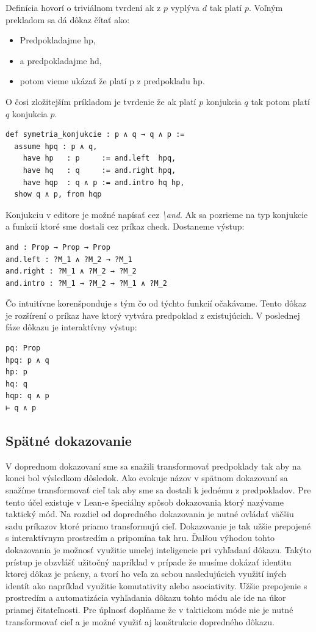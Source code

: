 \documentclass[a4paper,10pt,oneside]{report}%
\begin{document}
    Definícia hovorí o triviálnom tvrdení ak z $p$ vyplýva $d$ tak platí $p$. Voľným
prekladom sa dá dôkaz čítať ako:

\begin{itemize}
    \item Predpokladajme hp,
    \item a predpokladajme hd,
    \item potom vieme ukázať že platí p z predpokladu hp.
\end{itemize}

    O čosi zložitejším príkladom je tvrdenie že ak platí $p$ konjukcia $q$ tak potom
platí $q$ konjukcia $p$.

\begin{lstlisting}
def symetria_konjukcie : p ∧ q → q ∧ p :=
  assume hpq : p ∧ q,
    have hp   : p     := and.left  hpq,
    have hq   : q     := and.right hpq,
    have hqp  : q ∧ p := and.intro hq hp,
  show q ∧ p, from hqp
\end{lstlisting}

    Konjukciu v editore je možné napísať cez \emph{\textbackslash and}.
    Ak sa pozrieme na typ konjukcie a funkcií ktoré sme dostali cez príkaz check.
    Dostaneme výstup:

\begin{lstlisting}
and : Prop → Prop → Prop
and.left : ?M_1 ∧ ?M_2 → ?M_1
and.right : ?M_1 ∧ ?M_2 → ?M_2
and.intro : ?M_1 → ?M_2 → ?M_1 ∧ ?M_2
\end{lstlisting}

    Čo intuitívne korenšponduje s tým čo od týchto funkcií očakávame.
    Tento dôkaz je rozšírení o príkaz have ktorý vytvára predpoklad z existujúcich.
    V poslednej fáze dôkazu je interaktívny výstup:

\begin{lstlisting}
pq: Prop
hpq: p ∧ q
hp: p
hq: q
hqp: q ∧ p
⊢ q ∧ p
\end{lstlisting}

\subsection{Spätné dokazovanie}

V doprednom dokazovaní sme sa snažili transformovať predpoklady tak aby na konci
    bol výsledkom dôsledok.
Ako evokuje názov v spätnom dokazovaní sa snažíme transformovať cieľ tak aby sme
    sa dostali k jednému z predpokladov.
Pre tento účel existuje v Lean-e špeciálny spôsob dokazovania ktorý nazývame taktický
    mód.
Na rozdiel od dopredného dokazovania je nutné ovládať väčšiu sadu príkazov ktoré
    priamo transformujú cieľ.
Dokazovanie je tak užšie prepojené s interaktívnym prostredím a pripomína tak hru.
Ďalšou výhodou tohto dokazovania je možnosť využitie umelej inteligencie pri vyhľadaní
dôkazu.
Takýto prístup je obzvlášť užitočný napríklad v prípade že musíme dokázať identitu
    ktorej dôkaz je prácny, a tvorí ho veľa za sebou nasledujúcich využití iných
    identít ako napríklad využitie komutativity alebo asociativity.
Užšie prepojenie s prostredím a automatizácia vyhľadania dôkazu tohto módu ale
    ide na úkor priamej čitateľnosti.
Pre úplnosť doplňame že v taktickom móde nie je nutné transformovať cieľ a je možné
    využiť aj konštrukcie dopredného dôkazu.
\end{document}
